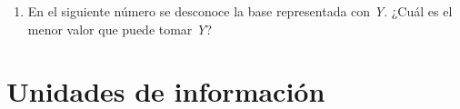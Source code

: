 \documentclass[12pt]{article}
\begin{document}
\begin{enumerate}

    \item En el siguiente número se desconoce la base representada con
        \emph{Y}. ¿Cuál es el menor valor que puede tomar \emph{Y}?



\end{enumerate}

\section{Unidades de información}
\end{document}
